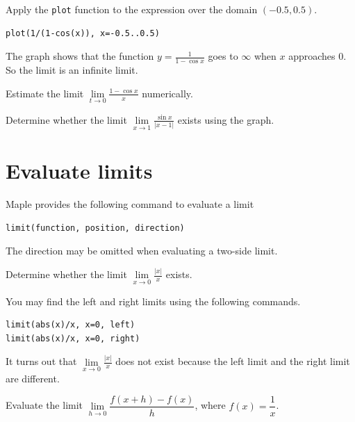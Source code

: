 \documentclass[]{book}
\theoremstyle{definition}
\theoremstyle{definition}
\theoremstyle{definition}
\theoremstyle{remark}
\let\BeginKnitrBlock\begin \let\EndKnitrBlock\end
\begin{document}
\BeginKnitrBlock{solution}
{}Apply the \texttt{plot} function to the expression over the domain \((-0.5, 0.5)\).

\begin{verbatim}
plot(1/(1-cos(x)), x=-0.5..0.5)
\end{verbatim}

The graph shows that the function \(y=\frac{1}{1- \cos x}\) goes to \(\infty\) when \(x\) approaches \(0\). So the limit is an infinite limit.
\EndKnitrBlock{solution}

\BeginKnitrBlock{exercise}
\protect\hypertarget{exr:unnamed-chunk-8}{}{\label{exr:unnamed-chunk-8} }Estimate the limit \(\lim\limits_{t \to 0}\frac{1-\cos x}{x}\) numerically.
\EndKnitrBlock{exercise}

\BeginKnitrBlock{exercise}
\protect\hypertarget{exr:unnamed-chunk-9}{}{\label{exr:unnamed-chunk-9} }Determine whether the limit \(\lim\limits_{x \to 1}\frac{\sin x}{|x-1|}\) exists using the graph.
\EndKnitrBlock{exercise}

\hypertarget{evaluate-limits}{%
\section{Evaluate limits}\label{evaluate-limits}}

Maple provides the following command to evaluate a limit

\begin{verbatim}
limit(function, position, direction)
\end{verbatim}

The direction may be omitted when evaluating a two-side limit.

\BeginKnitrBlock{example}
\protect\hypertarget{exm:unnamed-chunk-10}{}{\label{exm:unnamed-chunk-10} }Determine whether the limit \(\lim\limits_{x\to 0}\frac{|x|}{x}\) exists.
\EndKnitrBlock{example}

\BeginKnitrBlock{solution}
{}You may find the left and right limits using the following commands.

\begin{verbatim}
limit(abs(x)/x, x=0, left)
limit(abs(x)/x, x=0, right)
\end{verbatim}

It turns out that \(\lim\limits_{x\to 0}\frac{|x|}{x}\) does not exist because the left limit and the right limit are different.
\EndKnitrBlock{solution}

\BeginKnitrBlock{example}
\protect\hypertarget{exm:unnamed-chunk-12}{}{\label{exm:unnamed-chunk-12} }Evaluate the limit \(\lim\limits_{h\to 0}\dfrac{f(x+h)-f(x)}{h}\), where \(f(x)=\dfrac{1}{x}\).
\EndKnitrBlock{example}
\end{document}
